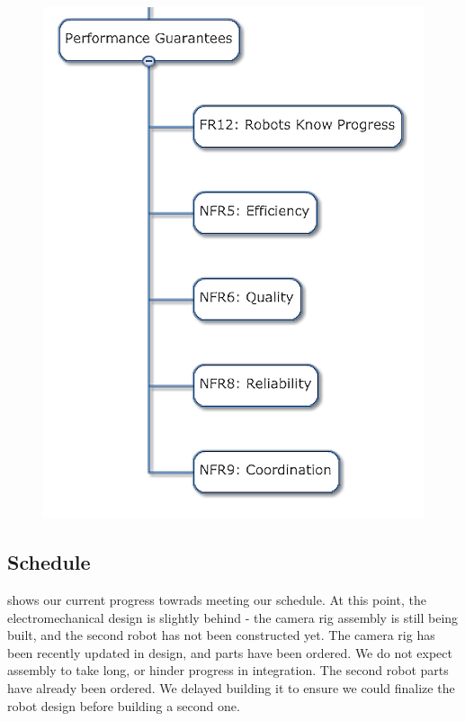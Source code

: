 \begin{figure}[h!]
\centering
\includegraphics[width=0.98\columnwidth]{figs/objectives_tree/objectives_tree_performance.png}
\label{fig:obj_tree_performance}
\end{figure}

\subsection{Schedule}
\label{sec:schedule}

 shows our current progress towrads meeting our schedule. At this point, the electromechanical design is slightly behind - the camera rig assembly is still being built, and the second robot has not been constructed yet. The camera rig has been recently updated in design, and parts have been ordered. We do not expect assembly to take long, or hinder progress in integration. The second robot parts have already been ordered. We delayed building it to ensure we could finalize the robot design before building a second one.

